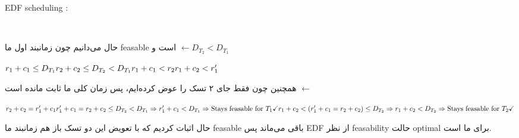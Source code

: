 \begin{latin}
  EDF scheduling : 
\\
\end{latin}
حال می‌دانیم چون زمانبند اول ما feasable است و $\leftarrow D_{T_2} < D_{T_1} $ 
\begin{latin}
  \noindent
  $
    r_1 + c_1 \leq D_{T_1} \\ r_2 + c_2 \leq D_{T_2} < D_{T_1}\\ 
    r_1 + c_1 < r_2 \\
    r_1 + c_2 < r'_1
  $
\end{latin}
همچنین چون فقط جای ۲ تسک را عوض کرده‌ایم، پس زمان کلی ما ثابت مانده است $\leftarrow$
\begin{latin}
  \noindent
  $
  r_2 + c_2 = r'_1 + c_1  \\ 
  r'_1 + c_1 = r_2 + c_2 \leq D_{T_2} < D_{T_1} \Rightarrow r'_1 + c_1 < D_{T_1} \Rightarrow \text{Stays feasable for } T_1 \checkmark \\
  r_1 + c_2 < (r'_1+c_1=r_2+c_2) \leq D_{T_2} \Rightarrow r_1 + c_2 < D_{T_2} \Rightarrow \text{Stays feasable for } T_2 \checkmark \\
  $
\end{latin}

حال اثبات کردیم که با تعویض این دو تسک باز هم زمانبند ما feasable 
باقی می‌ماند پس EDF از نظر 
feasability 
حالت optimal برای ما است.
